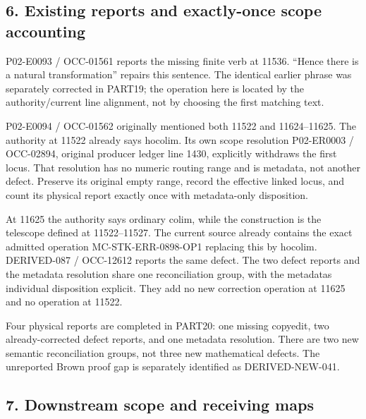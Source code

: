 \subsection{6. Existing reports and exactly-once scope accounting}\label{proofs-11460-11655-existing-reports-and-exactly-once-scope-accounting}

P02-E0093 /\allowbreak{} OCC-01561 reports the missing finite verb at 11536. ``Hence there is a natural transformation'' repairs this sentence. The identical earlier phrase was separately corrected in PART19; the operation here is located by the authority/\allowbreak{}current line alignment,\allowbreak{} not by choosing the first matching text.

P02-E0094 /\allowbreak{} OCC-01562 originally mentioned both 11522 and 11624–\allowbreak{}11625. The authority at 11522 already says hocolim. Its own scope resolution P02-ER0003 /\allowbreak{} OCC-02894,\allowbreak{} original producer ledger line 1430,\allowbreak{} explicitly withdraws the first locus. That resolution has no numeric routing range and is metadata,\allowbreak{} not another defect. Preserve its original empty range,\allowbreak{} record the effective linked locus,\allowbreak{} and count its physical report exactly once with metadata-only disposition.

At 11625 the authority says ordinary colim,\allowbreak{} while the construction is the telescope defined at 11522–\allowbreak{}11527. The current source already contains the exact admitted operation MC-STK-ERR-0898-OP1 replacing this by hocolim. DERIVED-087 /\allowbreak{} OCC-12612 reports the same defect. The two defect reports and the metadata resolution share one reconciliation group,\allowbreak{} with the metadata\textquotesingle s individual disposition explicit. They add no new correction operation at 11625 and no operation at 11522.

Four physical reports are completed in PART20:\allowbreak{} one missing copyedit,\allowbreak{} two already-corrected defect reports,\allowbreak{} and one metadata resolution. There are two new semantic reconciliation groups,\allowbreak{} not three new mathematical defects. The unreported Brown proof gap is separately identified as DERIVED-NEW-041.

\subsection{7. Downstream scope and receiving maps}\label{proofs-11460-11655-downstream-scope-and-receiving-maps}


